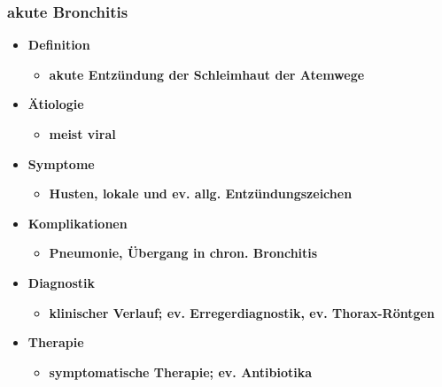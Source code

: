 	\subsubsection{akute Bronchitis}
		\begin{itemize}
			\item \textbf{Definition}
				\begin{itemize}
					\item \textbf{akute Entzündung der Schleimhaut der Atemwege}
				\end{itemize}
			\item \textbf{Ätiologie}
				\begin{itemize}
					\item \textbf{meist viral}
				\end{itemize}
			\item \textbf{Symptome}
				\begin{itemize}
					\item \textbf{Husten, lokale und ev. allg. Entzündungszeichen}
				\end{itemize}
			\item \textbf{Komplikationen}
				\begin{itemize}
					\item \textbf{Pneumonie, Übergang in chron. Bronchitis}
				\end{itemize}
			\item \textbf{Diagnostik}
				\begin{itemize}
					\item \textbf{klinischer Verlauf; ev. Erregerdiagnostik, ev. Thorax-Röntgen}
				\end{itemize}
			\item \textbf{Therapie}
				\begin{itemize}
					\item \textbf{symptomatische Therapie; ev. Antibiotika}
				\end{itemize}
		\end{itemize}
